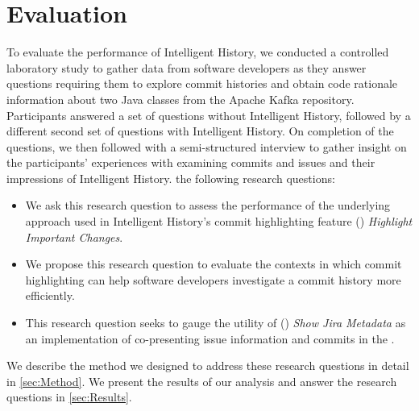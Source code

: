 \chapter{Evaluation}
\label{ch:Evaluation}

To evaluate the performance of Intelligent History, 
we conducted a controlled laboratory study to gather data from software developers as they answer questions
requiring them to explore commit histories and obtain code rationale information 
about two Java classes from the Apache Kafka repository.
Participants answered a set of questions without Intelligent History,
followed by a different second set of questions with Intelligent History.
On completion of the questions, we then followed with a semi-structured interview
to gather insight on the participants' experiences with examining commits and issues
and their impressions of Intelligent History.
 the following research questions:

\begin{itemize}[leftmargin=*]
    \item[]  
    We ask this research question to assess the performance of the underlying approach 
    used in Intelligent History's commit highlighting feature () \textit{Highlight Important Changes}.

    \item[] 
    We propose this research question to evaluate the contexts in which commit highlighting can help software developers
    investigate a commit history more efficiently.

    \item[] 
    This research question seeks to gauge the utility of () \textit{Show Jira Metadata} as
    an implementation of co-presenting issue information and commits in the .
\end{itemize}

We describe the method we designed to address these research questions in detail in \autoref{sec:Method}.
We present the results of our analysis and answer the research questions in \autoref{sec:Results}.

